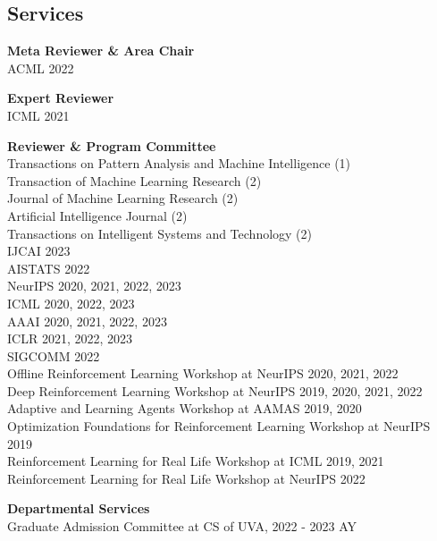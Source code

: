\documentclass[margin, 10pt]{res} %
\newcommand*{\universityservices}{}
\begin{document}
\begin{resume}
\section{Services}
{\textbf{Meta Reviewer \& Area Chair}} \\
ACML 2022

{\textbf{Expert Reviewer}} \\
ICML 2021

{\textbf{Reviewer \& Program Committee}} \\
Transactions on Pattern Analysis and Machine Intelligence (1) \\
Transaction of Machine Learning Research (2) \\
Journal of Machine Learning Research (2) \\
Artificial Intelligence Journal (2) \\
Transactions on Intelligent Systems and Technology (2) \\
IJCAI 2023 \\
AISTATS 2022 \\
NeurIPS 2020, 2021, 2022, 2023 \\
ICML 2020, 2022, 2023 \\
AAAI 2020, 2021, 2022, 2023 \\
ICLR 2021, 2022, 2023 \\
SIGCOMM 2022\\
Offline Reinforcement Learning Workshop at NeurIPS 2020, 2021, 2022 \\
Deep Reinforcement Learning Workshop at NeurIPS 2019, 2020, 2021, 2022 \\
Adaptive and Learning Agents Workshop at AAMAS 2019, 2020 \\
Optimization Foundations for Reinforcement Learning Workshop at NeurIPS 2019 \\
Reinforcement Learning for Real Life Workshop at ICML 2019, 2021 \\
Reinforcement Learning for Real Life Workshop at NeurIPS 2022

\ifdefined\universityservices
\textbf{Departmental Services} \\
Graduate Admission Committee at CS of UVA, 2022 - 2023 AY
\fi


\end{resume}
\end{document}
